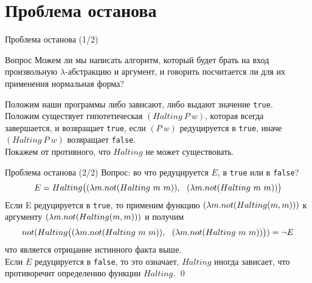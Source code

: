

\section{Проблема останова}

\begin{frame}{Проблема останова (1/2)}
  \begin{block}{Вопрос}
    Можем ли мы написать алгоритм, который будет брать на вход произвольную $\lambda$-абстракцию и аргумент, и говорить посчитается ли для их применения нормальная форма?\\
  \end{block}
  \pause
  Положим наши программы либо зависают, либо выдают значение \texttt{true}.\\

  Положим существует гипотетическая $(Halting\ P\ w)$, которая всегда завершается, и возвращает \texttt{true}, если $(P\ w)$ редуцируется в \texttt{true}, иначе $(Halting\ P\ w)$ возвращает \texttt{false}.\\

  Покажем от противного, что $Halting$ не может существовать.
\end{frame}

\begin{frame}{Проблема останова (2/2)}
  Вопрос: во что редуцируется $E$, в \texttt{true} или в \texttt{false}?
  \[
  E = Halting\big( \lam{m}{not(Halting\ m\ m)},\ \ \lam{m}{not(Halting \ m\ m)} \big)
  \]
  Если E редуцируется в \texttt{true}, то применим функцию $(\lambda m . not(Halting(m,m)))$ к аргументу $(\lambda m . not(Halting(m,m)))$ и получим
  \[
  not ( Halting\big(\lam{m}{not(Halting \ m\ m)},\ \ \lam{m}{not(Halting \ m\ m)}\big)) = \neg E
  \]
  что является отрицание истинного факта выше.\\

  Если $E$ редуцируется в \texttt{false}, то это означает, $Halting$ иногда зависает, что противоречит определению функции $Halting$.
  \qed
\end{frame}


